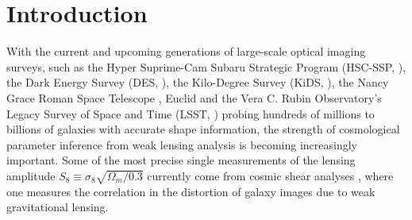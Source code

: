 \section{Introduction}
\label{sec:intro}

With the current and upcoming generations of large-scale optical imaging surveys, such as the Hyper Suprime-Cam Subaru Strategic Program (HSC-SSP, \cite{HSC2022datarelease3}), the Dark Energy Survey (DES, \cite{DES2018datarelease1}), the Kilo-Degree Survey (KiDS, \cite{KiDS2025datarelease5}), the Nancy Grace Roman Space Telescope \cite{roman2019wfirst}, Euclid \cite{EuclidI2024overview} and the Vera C. Rubin Observatory's Legacy Survey of Space and Time (LSST, \cite{LSST2019survey}) probing hundreds of millions to billions of galaxies with accurate shape information, the strength of cosmological parameter inference from weak lensing analysis is becoming increasingly important. Some of the most precise single measurements of the lensing amplitude $S_8\equiv\sigma_8\sqrt{\Omega_m/0.3}$ currently come from cosmic shear analyses \cite{CosmoShearLi2023HSCY3, Dalal2023CosmoShearHSC, Amon2022CosmoShearDES, Secco2022CosmoShearDES, Asgari2021KidsCosmoShear, wright2025kidslegacyCosmoShear}, where one measures the correlation in the distortion of galaxy images due to weak gravitational lensing. 


